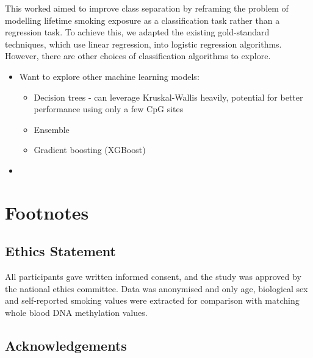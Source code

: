 \documentclass{article} %
\begin{document}
This worked aimed to improve class separation by reframing the problem of modelling lifetime smoking exposure as a classification task rather than a regression task. To achieve this, we adapted the existing gold-standard techniques, which use linear regression, into logistic regression algorithms. However, there are other choices of classification algorithms to explore.


\begin{itemize}
    \item Want to explore other machine learning models:
          \begin{itemize}
              \item Decision trees - can leverage Kruskal-Wallis heavily, potential for better performance using only a few CpG sites
              \item Ensemble
              \item Gradient boosting (XGBoost)
          \end{itemize}
    \item
\end{itemize}

\section{Footnotes}

\subsection{Ethics Statement}
All participants gave written informed consent, and the study was approved by the national ethics committee. Data was anonymised and only age, biological sex and self-reported smoking values were extracted for comparison with matching whole blood DNA methylation values.

\subsection{Acknowledgements}

\printbibliography
\end{document}
